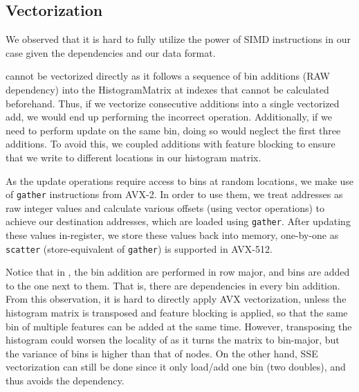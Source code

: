 \subsection{Vectorization}
We observed that it is hard to fully utilize the power of SIMD instructions in our case given the dependencies and our data format. 

\mypar{\update}
\update cannot be vectorized directly as it follows a sequence of bin additions (RAW dependency) into the HistogramMatrix at indexes that cannot be calculated beforehand. Thus, if we vectorize consecutive additions into a single vectorized add, we would end up performing the incorrect operation. Additionally, if we need to perform update on the same bin, doing so would neglect the first three additions. To avoid this, we coupled additions with feature blocking to ensure that we write to different locations in our histogram matrix. 

As the update operations require access to bins at random locations, we make use of \texttt{gather} instructions from AVX-2. In order to use them, we treat addresses as raw integer values and calculate various offsets (using vector operations) to achieve our destination addresses, which are loaded using \texttt{gather}. After updating these values in-register, we store these values back into memory, one-by-one as \texttt{scatter} (store-equivalent of \texttt{gather}) is supported in AVX-512.

\mypar{\cumulate}
Notice that in \cumulate, the bin addition are performed in row major, and bins are added to the one next to them. That is, there are dependencies in every bin addition.
From this observation, it is hard to directly apply AVX vectorization, unless the histogram matrix is transposed and feature blocking is applied, so that the same bin of multiple features can be added at the same time. However, transposing the histogram could worsen the locality of \update as it turns the matrix to bin-major, but the variance of bins is higher than that of nodes. On the other hand, SSE vectorization can still be done since it only load/add one bin (two doubles), and thus avoids the dependency.


